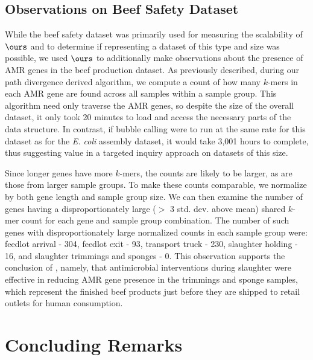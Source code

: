 \documentclass[doctor]{thesis}
\begin{document}
\subsection{Observations on Beef Safety Dataset}

While the beef safety dataset was primarily used for measuring the scalability of $\ours$ and to determine if representing a dataset of this type and size was possible, we used $\ours$ to additionally make observations about the presence of AMR genes in the beef production dataset.  As previously described, during our path divergence derived algorithm, we compute a count of how many $k$-mers in each AMR gene are found across all samples within a sample group.  This algorithm need only traverse the AMR genes, so despite the size of the overall dataset, it only took 20 minutes to load and access the necessary parts of the data structure.  In contrast, if bubble calling were to run at the same rate for this dataset as for the {\it E. coli} assembly dataset, it would take 3,001 hours to complete, thus suggesting value in a targeted inquiry approach on datasets of this size.  

Since longer genes have more $k$-mers, the counts are likely to be larger, as are those from larger sample groups.  To make these counts comparable, we normalize by both gene length and sample group size.  We can then examine the number of genes having a disproportionately large ($>$ 3 std. dev. above mean) shared $k$-mer count for each gene and sample group combination.  The number of such genes with disproportionately large normalized counts in each sample group were:  feedlot arrival - 304, feedlot exit - 93, transport truck - 230, slaughter holding - 16, and slaughter trimmings and sponges - 0.
This observation supports the conclusion of \cite{noyes2016resistome}, namely, that antimicrobial interventions during slaughter were effective in reducing AMR gene presence in the trimmings and sponge samples, which represent the finished beef products just before they are shipped to retail outlets for human consumption. 
 
\makeatletter{}\section{Concluding Remarks}
\label{sec:conclusion}
\end{document}
